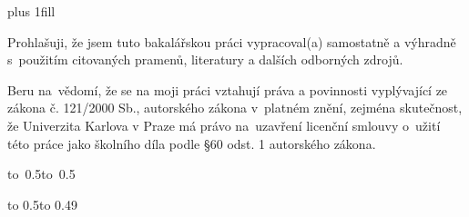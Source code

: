 
\newpage

\vglue 0pt plus 1fill

\noindent
Prohlašuji, že jsem tuto bakalářskou práci vypracoval(a) samostatně a výhradně
s~použitím citovaných pramenů, literatury a dalších odborných zdrojů.

\medskip\noindent
Beru na~vědomí, že se na moji práci vztahují práva a povinnosti vyplývající
ze zákona č. 121/2000 Sb., autorského zákona v~platném znění, zejména skutečnost,
že Univerzita Karlova v Praze má právo na~uzavření licenční smlouvy o~užití této
práce jako školního díla podle §60 odst. 1 autorského zákona.

\vspace{10mm}

\hbox{\hbox to 0.5\hbox to 0.5}

\vspace{20mm}
\newpage


\vbox to 0.5\nobreak\vbox to 0.49


